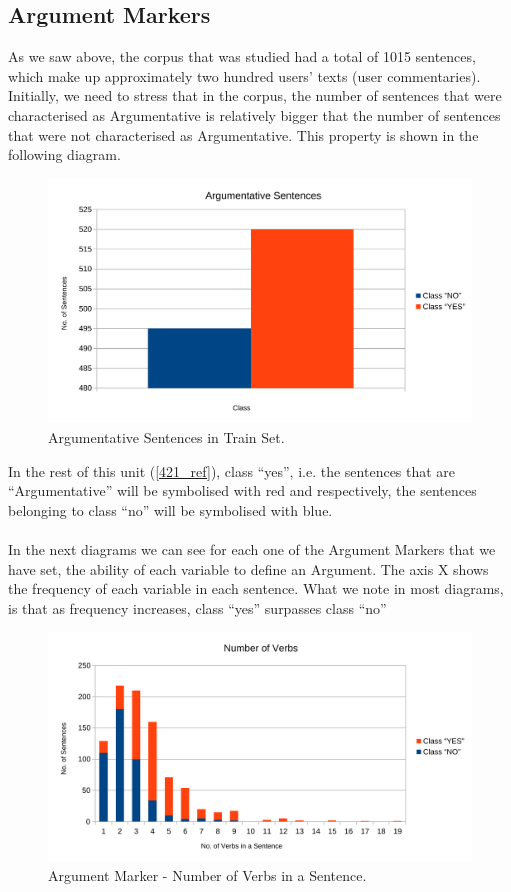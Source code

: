 \subsection{Argument Markers}\label{411_ref}
As we saw above, the corpus that was studied had a total of 1015 sentences, which make up approximately two hundred users' texts (user commentaries). Initially, we need to stress that in the corpus, the number of sentences that were characterised as Argumentative is relatively bigger that the number of sentences that were not characterised as Argumentative. This property is shown in the following diagram.
\begin{figure}[H]
\centering
\includegraphics[width=0.9\linewidth]{figure/arguments/A_argumentative1.pdf}
\caption{Argumentative Sentences in Train Set.}
\end{figure}

In the rest of this unit (\ref{421_ref}), class ``yes'', i.e. the sentences that are ``Argumentative'' will be symbolised with red and respectively, the sentences belonging to class ``no'' will be symbolised with blue.\\
\\
In the next diagrams we can see  for each one of the Argument Markers that we have set, the ability of each variable to define an Argument. The axis X shows the frequency of each variable in each sentence. What we note in most diagrams, is that as frequency increases, class ``yes'' surpasses class ``no''

\begin{figure}[H]
\centering
\includegraphics[width=0.8\linewidth]{figure/arguments/A_verbs1.pdf}
\caption{Argument Marker - Number of Verbs in a Sentence.}
\end{figure}

